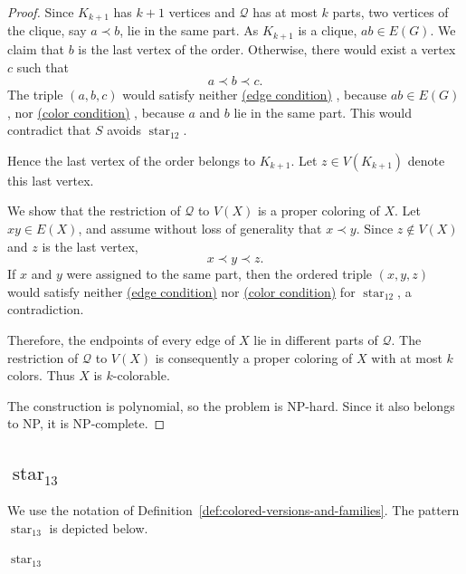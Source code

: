 \documentclass[12pt]{article}
\theoremstyle{plain}
\theoremstyle{definition}
\theoremstyle{remark}
\theoremstyle{definition}
\newcommand{\edgecondition}{%
  \hyperref[def:avoid:cond:edge]{(edge condition)}\xspace
}
\newcommand{\colorcondition}{%
  \hyperref[def:avoid:cond:color]{(color condition)}\xspace
}
\newcommand{\starlabel}{\mathrm{star}}
\DeclareRobustCommand{\starparam}[1]{%
  \ensuremath{\mathop{\starlabel}\nolimits_{#1}}%
}
\begin{document}
\begin{proof}
Since \(K_{k+1}\) has \(k+1\) vertices and \(\mathcal Q\) has at most \(k\) parts, two vertices of the clique,
say \(a\prec b\), lie in the same part. As \(K_{k+1}\) is a clique, \(ab\in E(G)\). We claim that \(b\) is the
last vertex of the order. Otherwise, there would exist a vertex \(c\) such that
\[
a\prec b\prec c.
\]
The triple \((a,b,c)\) would satisfy neither \edgecondition, because \(ab\in E(G)\), nor \colorcondition, because
\(a\) and \(b\) lie in the same part. This would contradict that \(S\) avoids
\(\operatorname{star}_{12}\).

Hence the last vertex of the order belongs to \(K_{k+1}\). Let \(z\in V(K_{k+1})\) denote this last vertex.

We show that the restriction of \(\mathcal Q\) to \(V(X)\) is a proper coloring of \(X\). Let \(xy\in E(X)\), and
assume without loss of generality that \(x\prec y\). Since \(z\notin V(X)\) and \(z\) is the last vertex,
\[
x\prec y\prec z.
\]
If \(x\) and \(y\) were assigned to the same part, then the ordered triple \((x,y,z)\) would satisfy neither
\edgecondition{} nor \colorcondition{} for \(\operatorname{star}_{12}\), a contradiction.

Therefore, the endpoints of every edge of \(X\) lie in different parts of \(\mathcal Q\). The restriction of
\(\mathcal Q\) to \(V(X)\) is consequently a proper coloring of \(X\) with at most \(k\) colors. Thus \(X\) is
\(k\)-colorable.

The construction is polynomial, so the problem is NP-hard. Since it also belongs to NP, it is NP-complete.
\end{proof}




\subsection{\texorpdfstring{\(\starparam{13}\)}{star13}}
\label{subsec:star13}

We use the notation of
Definition~\ref{def:colored-versions-and-families}.
The pattern \(\starparam{13}\) is depicted below.

\begin{center}

\smallskip
\(\starparam{13}\)
\end{center}
\end{document}
